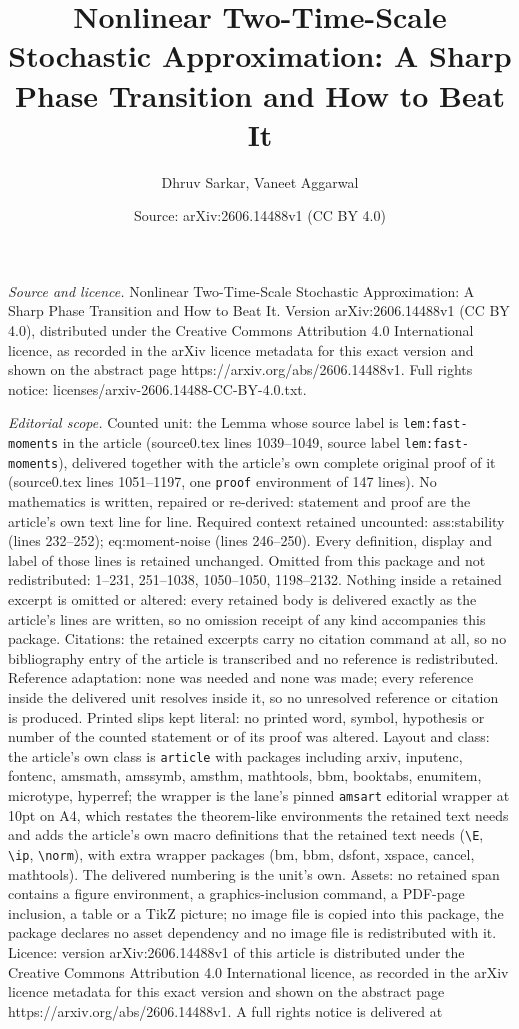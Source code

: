 \documentclass[10pt,a4paper]{amsart}
\title[Nonlinear Two-Time-Scale Stochastic Approximation: A Sharp P]{Nonlinear Two-Time-Scale Stochastic Approximation: A Sharp Phase Transition and How to Beat It}
\author{Dhruv Sarkar, Vaneet Aggarwal}
\date{Source: arXiv:2606.14488v1 (CC BY 4.0)}
\begin{document}
\maketitle

\noindent\emph{Source and licence.} Nonlinear Two-Time-Scale Stochastic Approximation: A Sharp Phase Transition and How to Beat It. Version arXiv:2606.14488v1 (CC BY 4.0), distributed under the Creative Commons Attribution 4.0 International licence, as recorded in the arXiv licence metadata for this exact version and shown on the abstract page https://arxiv.org/abs/2606.14488v1. Full rights notice: licenses/arxiv-2606.14488-CC-BY-4.0.txt.\par\smallskip

\noindent\textit{Editorial scope.} Counted unit: the Lemma whose source label is \texttt{lem:fast-moments} in the article (source0.tex lines 1039--1049, source label \texttt{lem:fast-moments}), delivered together with the article's own complete original proof of it (source0.tex lines 1051--1197, one \texttt{proof} environment of 147 lines). No mathematics is written, repaired or re-derived: statement and proof are the article's own text line for line. Required context retained uncounted: ass:stability (lines 232--252); eq:moment-noise (lines 246--250). Every definition, display and label of those lines is retained unchanged. Omitted from this package and not redistributed: 1--231, 251--1038, 1050--1050, 1198--2132. Nothing inside a retained excerpt is omitted or altered: every retained body is delivered exactly as the article's lines are written, so no omission receipt of any kind accompanies this package. Citations: the retained excerpts carry no citation command at all, so no bibliography entry of the article is transcribed and no reference is redistributed. Reference adaptation: none was needed and none was made; every reference inside the delivered unit resolves inside it, so no unresolved reference or citation is produced. Printed slips kept literal: no printed word, symbol, hypothesis or number of the counted statement or of its proof was altered. Layout and class: the article's own class is \texttt{article} with packages including arxiv, inputenc, fontenc, amsmath, amssymb, amsthm, mathtools, bbm, booktabs, enumitem, microtype, hyperref; the wrapper is the lane's pinned \texttt{amsart} editorial wrapper at 10pt on A4, which restates the theorem-like environments the retained text needs and adds the article's own macro definitions that the retained text needs (\texttt{\textbackslash E}, \texttt{\textbackslash ip}, \texttt{\textbackslash norm}), with extra wrapper packages (bm, bbm, dsfont, xspace, cancel, mathtools). The delivered numbering is the unit's own. Assets: no retained span contains a figure environment, a graphics-inclusion command, a PDF-page inclusion, a table or a TikZ picture; no image file is copied into this package, the package declares no asset dependency and no image file is redistributed with it. Licence: version arXiv:2606.14488v1 of this article is distributed under the Creative Commons Attribution 4.0 International licence, as recorded in the arXiv licence metadata for this exact version and shown on the abstract page https://arxiv.org/abs/2606.14488v1. A full rights notice is delivered at 
\end{document}
